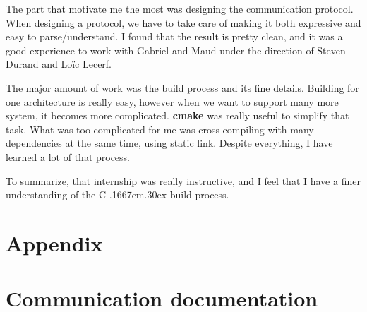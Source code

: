\documentclass[a4paper,11pt]{custom}
\newcommand{\cmake}{\textbf{cmake}\xspace}
\newcommand{\cpp}{%
  C\kern-.1667em\raise.30ex\hbox{\smaller{++}\xspace}%
  \spacefactor1000%
}
\begin{document}
The part that motivate me the most was designing the communication protocol.
When designing a protocol, we have to take care of making it both expressive and
easy to parse/understand. I found that the result is pretty clean, and it was a
good experience to work with Gabriel and Maud under the direction of Steven
Durand and Loïc Lecerf.

The major amount of work was the build process and its fine details. Building
for one architecture is really easy, however when we want to support many more
system, it becomes more complicated. \cmake{} was really useful to simplify that
task. What was too complicated for me was cross-compiling with many dependencies
at the same time, using static link. Despite everything, I have learned a lot of
that process.

To summarize, that internship was really instructive, and I feel that I have a
finer understanding of the \cpp{} build process.

\appendix

\chapter*{Appendix}

\chapter{Communication documentation}
\label{sec:documentation}

\end{document}
